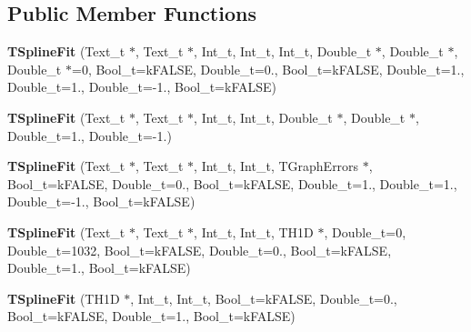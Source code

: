 \subsection*{Public Member Functions}
\begin{DoxyCompactItemize}
\item 
\hypertarget{classTSplineFit_a73d3664e6c41136c8e7a44939ab9446d}{{\bfseries T\-Spline\-Fit} (Text\-\_\-t $\ast$, Text\-\_\-t $\ast$, Int\-\_\-t, Int\-\_\-t, Int\-\_\-t, Double\-\_\-t $\ast$, Double\-\_\-t $\ast$, Double\-\_\-t $\ast$=0, Bool\-\_\-t=k\-F\-A\-L\-S\-E, Double\-\_\-t=0., Bool\-\_\-t=k\-F\-A\-L\-S\-E, Double\-\_\-t=1., Double\-\_\-t=1., Double\-\_\-t=-\/1., Bool\-\_\-t=k\-F\-A\-L\-S\-E)}\label{classTSplineFit_a73d3664e6c41136c8e7a44939ab9446d}

\item 
\hypertarget{classTSplineFit_a64ae4d613a635d549d981556e197cef7}{{\bfseries T\-Spline\-Fit} (Text\-\_\-t $\ast$, Text\-\_\-t $\ast$, Int\-\_\-t, Int\-\_\-t, Double\-\_\-t $\ast$, Double\-\_\-t $\ast$, Double\-\_\-t=1., Double\-\_\-t=-\/1.)}\label{classTSplineFit_a64ae4d613a635d549d981556e197cef7}

\item 
\hypertarget{classTSplineFit_aaefc1bc418abac377297ef86a25e9329}{{\bfseries T\-Spline\-Fit} (Text\-\_\-t $\ast$, Text\-\_\-t $\ast$, Int\-\_\-t, Int\-\_\-t, T\-Graph\-Errors $\ast$, Bool\-\_\-t=k\-F\-A\-L\-S\-E, Double\-\_\-t=0., Bool\-\_\-t=k\-F\-A\-L\-S\-E, Double\-\_\-t=1., Double\-\_\-t=1., Double\-\_\-t=-\/1., Bool\-\_\-t=k\-F\-A\-L\-S\-E)}\label{classTSplineFit_aaefc1bc418abac377297ef86a25e9329}

\item 
\hypertarget{classTSplineFit_a60c8f52793583adfc19dcd144a008202}{{\bfseries T\-Spline\-Fit} (Text\-\_\-t $\ast$, Text\-\_\-t $\ast$, Int\-\_\-t, Int\-\_\-t, T\-H1\-D $\ast$, Double\-\_\-t=0, Double\-\_\-t=1032, Bool\-\_\-t=k\-F\-A\-L\-S\-E, Double\-\_\-t=0., Bool\-\_\-t=k\-F\-A\-L\-S\-E, Double\-\_\-t=1., Bool\-\_\-t=k\-F\-A\-L\-S\-E)}\label{classTSplineFit_a60c8f52793583adfc19dcd144a008202}

\item 
\hypertarget{classTSplineFit_a4ee04eb101d0deec8abab21994d90458}{{\bfseries T\-Spline\-Fit} (T\-H1\-D $\ast$, Int\-\_\-t, Int\-\_\-t, Bool\-\_\-t=k\-F\-A\-L\-S\-E, Double\-\_\-t=0., Bool\-\_\-t=k\-F\-A\-L\-S\-E, Double\-\_\-t=1., Bool\-\_\-t=k\-F\-A\-L\-S\-E)}\label{classTSplineFit_a4ee04eb101d0deec8abab21994d90458}


\end{DoxyCompactItemize}
